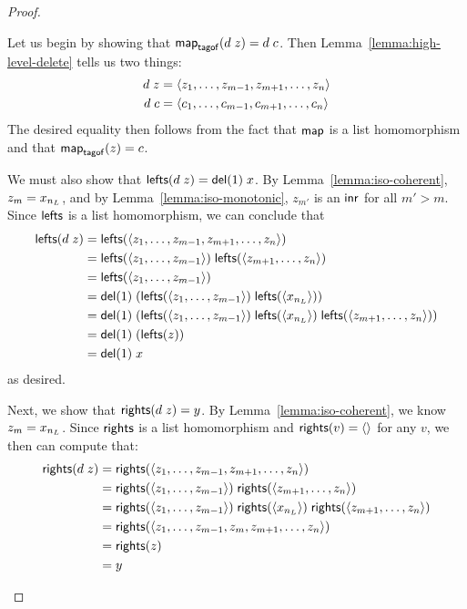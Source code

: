 \begin{proof}
{\begin{trivlist}
    Let us begin by showing that $\mathsf{map}_{\mathsf{tagof}}(d\;z)=d\;c$. Then
    Lemma~\ref{lemma:high-level-delete} tells us two things:
    \begin{align*}
        d\;z &= \left< z_1 ,\ldots, z_{m-1} , z_{m+1} ,\ldots, z_n \right> \\
        d\;c &= \left< c_1 ,\ldots, c_{m-1} , c_{m+1} ,\ldots, c_n \right>
    \end{align*}
    The desired equality then follows from the fact that $\mathsf{map}$ is a list
    homomorphism and that $\mathsf{map}_{\mathsf{tagof}}(z)=c$.

    We must also show that $\mathsf{lefts}(d\;z)=\mathsf{del}(1)\;x$. By
    Lemma~\ref{lemma:iso-coherent}, $z_m={x_{n_L}}$, and by
    Lemma~\ref{lemma:iso-monotonic}, $z_{m'}$ is an $\mathsf{inr}$ for all
    $m'>m$. Since $\mathsf{lefts}$ is a list homomorphism, we can conclude that
    \begin{align*}
        \mathsf{lefts}(d\;z) &=
            \mathsf{lefts}(\left< z_1 ,\ldots, z_{m-1} , z_{m+1} ,\ldots, z_n \right>)
        \\ &=
            \mathsf{lefts}(\left< z_1 ,\ldots, z_{m-1} \right>)\;
            \mathsf{lefts}(\left< z_{m+1} ,\ldots, z_n \right>)
        \\ &=
            \mathsf{lefts}(\left< z_1 ,\ldots, z_{m-1} \right>)
        \\ &=
            \mathsf{del}(1)\;(\mathsf{lefts}(\left< z_1 ,\ldots, z_{m-1} \right>)\;
                      \mathsf{lefts}(\left< {x_{n_L}} \right>))
        \\ &=
            \mathsf{del}(1)\;(\mathsf{lefts}(\left< z_1 ,\ldots, z_{m-1} \right>)\;
                      \mathsf{lefts}(\left< {x_{n_L}} \right>)\;
                      \mathsf{lefts}(\left< z_{m+1} ,\ldots, z_n \right>))
        \\ &=
            \mathsf{del}(1)\;(\mathsf{lefts}(z))
        \\ &=
            \mathsf{del}(1)\;x
    \end{align*}
    as desired.

    Next, we show that $\mathsf{rights}(d\;z)=y$. By
    Lemma~\ref{lemma:iso-coherent}, we know $z_m={x_{n_L}}$. Since
    $\mathsf{rights}$ is a list homomorphism and $\mathsf{rights}( v)=\left<\right>$
    for any $v$, we then can compute that:
    \begin{align*}
        \mathsf{rights}(d\;z) &=
            \mathsf{rights}(\left< z_1 ,\ldots, z_{m-1} , z_{m+1} ,\ldots, z_n \right>)
        \\ &=
            \mathsf{rights}(\left< z_1 ,\ldots, z_{m-1} \right>)\;
            \mathsf{rights}(\left< z_{m+1} ,\ldots, z_n \right>)
        \\ &=
            \mathsf{rights}(\left< z_1 ,\ldots, z_{m-1} \right>)\;
            \mathsf{rights}(\left< {x_{n_L}} \right>)\;
            \mathsf{rights}(\left< z_{m+1} ,\ldots, z_n \right>)
        \\ &=
            \mathsf{rights}(\left< z_1 ,\ldots, z_{m-1} , z_m , z_{m+1} ,\ldots, z_n \right>)
        \\ &=
            \mathsf{rights}(z)
        \\ &=
            y
    \end{align*}


\end{trivlist}}
\end{proof}
